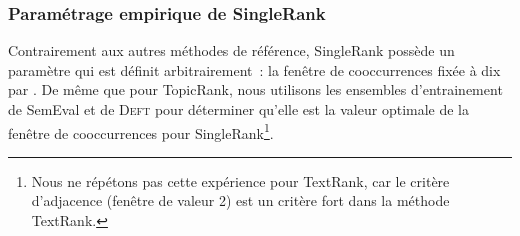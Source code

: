       \subsubsection{Paramétrage empirique de SingleRank}
      \label{subsubsec:main:domain_independent_keyphrase_extraction-unsupervised_automatic_keyphrase_extraction-evaluation-empirical_setting_of_singlerank}
        Contrairement aux autres méthodes de référence, SingleRank possède un
        paramètre qui est définit arbitrairement~: la fenêtre de cooccurrences
        fixée à dix par . De même que pour TopicRank,
        nous utilisons les ensembles d'entrainement de SemEval et de
        \textsc{Deft} pour déterminer qu'elle est la valeur optimale de la
        fenêtre de cooccurrences pour SingleRank\footnote{Nous ne répétons pas
        cette expérience pour TextRank, car le critère d'adjacence (fenêtre de
        valeur 2) est un critère fort dans la méthode TextRank.}. 

